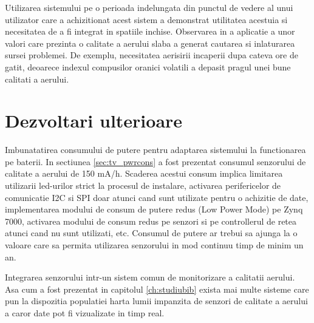 Utilizarea sistemului pe o perioada indelungata din punctul de vedere al unui utilizator care a achizitionat acest sistem a demonstrat utilitatea acestuia si necesitatea 
de a fi integrat in spatiile inchise. Observarea in a aplicatie a unor valori care prezinta o calitate a aerului slaba a generat cautarea si inlaturarea sursei problemei. 
De exemplu, necesitatea aerisirii incaperii dupa cateva ore de gatit, deoarece indexul compusilor oranici volatili a depasit pragul unei bune calitati a aerului.

\section{Dezvoltari ulterioare}\label{c_dezvoltari_ulterioare}
Imbunatatirea consumului de putere pentru adaptarea sistemului la functionarea pe baterii. In sectiunea \ref{sec:tv_pwrcons} a fost prezentat consumul senzorului de 
calitate a aerului de 150 mA/h. Scaderea acestui consum implica limitarea utilizarii led-urilor strict la procesul de instalare, activarea perifericelor de comunicatie 
I2C si SPI doar atunci cand sunt utilizate pentru o achizitie de date, implementarea modului de consum de putere redus (Low Power Mode) pe Zynq 7000, activarea modului 
de consum redus pe senzori si pe controllerul de retea atunci cand nu sunt utilizati, etc. Consumul de putere ar trebui sa ajunga la o valoare care sa permita utilizarea 
senzorului in mod continuu timp de minim un an.

Integrarea senzorului intr-un sistem comun de monitorizare a calitatii aerului. Asa cum a fost prezentat in capitolul \ref{ch:studiubib} exista mai multe sisteme care pun 
la dispozitia populatiei harta lumii impanzita de senzori de calitate a aerului a caror date pot fi vizualizate in timp real.


